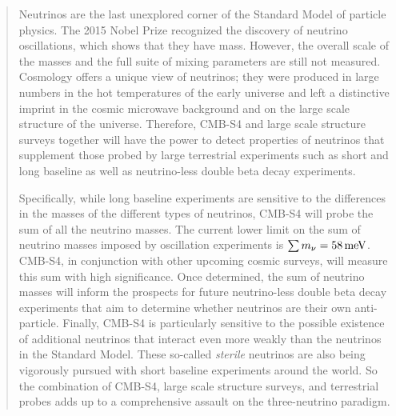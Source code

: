 \begin{quotation}

Neutrinos are the last unexplored corner of the Standard Model of particle physics.  The 2015 Nobel Prize recognized the discovery of neutrino oscillations, which shows that they have mass. However, the overall scale of the masses and the full suite of mixing parameters are still not measured.  Cosmology offers a unique view of neutrinos; they were produced in large numbers in the hot temperatures of the early universe and left a distinctive imprint in the cosmic microwave background and on the large scale structure of the universe. Therefore, CMB-S4 and large scale structure surveys together will have the power to detect properties of neutrinos that supplement those probed by large terrestrial experiments such as short and long baseline as well as neutrino-less double beta decay experiments.

Specifically, while long baseline experiments are sensitive to the differences in the masses of the different types of neutrinos, CMB-S4  will probe the sum of all the neutrino masses. The current lower limit on the sum of neutrino masses imposed by oscillation experiments is \mbox{$\sum m_\nu=58\,\rm{meV}$}. CMB-S4, in conjunction with other upcoming cosmic surveys, will measure this sum with high significance. Once determined, the sum of neutrino masses will inform the prospects for future neutrino-less double beta decay experiments that aim to determine whether neutrinos are their own anti-particle. Finally, CMB-S4 is particularly sensitive to the possible existence of additional neutrinos that interact even more weakly than the neutrinos in the Standard Model. These so-called {\it sterile} neutrinos are also being vigorously pursued with short baseline experiments around the world. So the combination of CMB-S4, large scale structure surveys, and terrestrial probes adds up to a comprehensive assault on the three-neutrino paradigm. 





\end{quotation}
